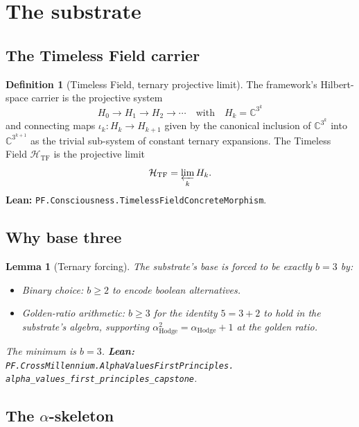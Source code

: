 \documentclass[11pt,a4paper]{article}
\theoremstyle{plain}
\newtheorem{lemma}[theorem]{Lemma}
\theoremstyle{definition}
\newtheorem{definition}[theorem]{Definition}
\begin{document}
\section{The substrate}
\label{sec:substrate}

\subsection{The Timeless Field carrier}

\begin{definition}[Timeless Field, ternary projective limit]
\label{def:tf}
The framework's Hilbert-space carrier is the projective system
\[
H_{0} \to H_{1} \to H_{2} \to \cdots
\quad\text{with}\quad
H_{k} = \mathbb{C}^{3^{k}}
\]
and connecting maps $\iota_{k}: H_{k} \to H_{k+1}$ given by the
canonical inclusion of $\mathbb{C}^{3^{k}}$ into $\mathbb{C}^{3^{k+1}}$
as the trivial sub-system of constant ternary expansions. The
Timeless Field $\mathcal{H}_{\mathrm{TF}}$ is the projective limit
\[
\mathcal{H}_{\mathrm{TF}} = \varprojlim_{k} H_{k}.
\]
\textbf{Lean:} \texttt{PF.Consciousness.TimelessFieldConcreteMorphism}.
\end{definition}

\subsection{Why base three}

\begin{lemma}[Ternary forcing]
The substrate's base is forced to be exactly $b = 3$ by:
\begin{itemize}[leftmargin=*,nosep]
\item \emph{Binary choice:} $b \ge 2$ to encode boolean alternatives.
\item \emph{Golden-ratio arithmetic:} $b \ge 3$ for the identity
$5 = 3 + 2$ to hold in the substrate's algebra, supporting
$\alpha_{\mathrm{Hodge}}^{2} = \alpha_{\mathrm{Hodge}} + 1$ at the
golden ratio.
\end{itemize}
The minimum is $b = 3$. \textbf{Lean:}
\texttt{PF.CrossMillennium.AlphaValuesFirstPrinciples.\\
alpha\_values\_first\_principles\_capstone}.
\end{lemma}

\subsection{The $\alpha$-skeleton}
\end{document}
